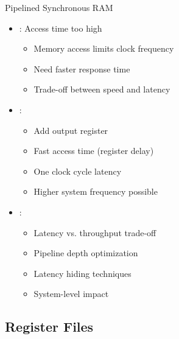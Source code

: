 \begin{frame}{Pipelined Synchronous RAM}
\begin{itemize}
\item {}: Access time too high
\begin{itemize}
\item Memory access limits clock frequency
\item Need faster response time
\item Trade-off between speed and latency
\end{itemize}
\vspace{0.5cm}
\item {}:
\begin{itemize}
\item Add output register
\item Fast access time (register delay)
\item One clock cycle latency
\item Higher system frequency possible
\end{itemize}
\vspace{0.3cm}
\item {}:
\begin{itemize}
\item Latency vs. throughput trade-off
\item Pipeline depth optimization
\item Latency hiding techniques
\item System-level impact
\end{itemize}
\end{itemize}
\end{frame}

\subsection{Register Files}

